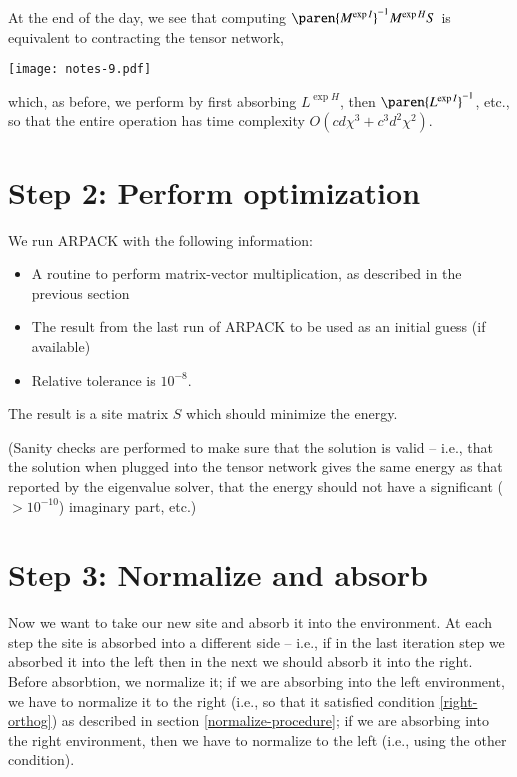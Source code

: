 \documentclass[12pt]{amsart}
\begin{document}
At the end of the day, we see that computing $\paren{M^{\exp{I}}}^{-1} M^{\exp{H}}S$ is equivalent to contracting the tensor network,

    \begin{center}\texttt{[image: notes-9.pdf]}\end{center}

\noindent which, as before, we perform by first absorbing $L^{\exp{H}}$, then $\paren{L^{\exp{I}}}^{-1}$, etc., so that the entire operation has time complexity $O(cd\chi^3 + c^3d^2\chi^2)$.

\section*{Step 2:  Perform optimization}

We run ARPACK with the following information:

\begin{itemize}
\item A routine to perform matrix-vector multiplication, as described in the previous section
\item The result from the last run of ARPACK to be used as an initial guess (if available)
\item Relative tolerance is $10^{-8}$.
\end{itemize}

The result is a site matrix $S$ which should minimize the energy.

(Sanity checks are performed to make sure that the solution is valid -- i.e., that the solution when plugged into the tensor network gives the same energy as that reported by the eigenvalue solver, that the energy should not have a significant ($>10^{-10}$) imaginary part, etc.)

\section*{Step 3: Normalize and absorb}

Now we want to take our new site and absorb it into the environment.  At each step the site is absorbed into a different side -- i.e., if in the last iteration step we absorbed it into the left then in the next we should absorb it into the right.  Before absorbtion, we normalize it;  if we are absorbing into the left environment, we have to normalize it to the right (i.e., so that it satisfied condition \eqref{right-orthog}) as described in section \ref{normalize-procedure};  if we are absorbing into the right environment, then we have to normalize to the left (i.e., using the other condition).
\end{document}
